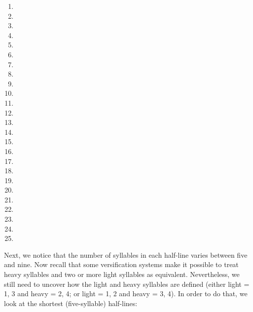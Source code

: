 \begin{refsection}
\begin{mysolution}
\begin{multicols}{2}
\begin{enumerate}[noitemsep]
    \item {}
    \item {}
    \item {}
    \item {}
    \item {}
    \item {}
    \item {}
    \item {}
    \item {}
    \item {}
    \item {}
    \item {}
    \item {}
    \item {}
    \item {}
    \item {}
    \item {}
    \item {}
    \item {}
    \item {}
    \item {}
    \item {}
    \item {}
    \item {}
    \item {}
    \blankitem
\end{enumerate}
\end{multicols}

Next, we notice that the number of syllables in each half-line varies between five and nine. Now recall that some versification systems make it possible to treat heavy syllables and two or more light syllables as equivalent. Nevertheless, we still need to uncover how the light and heavy syllables are defined (either light = 1, 3 and heavy = 2, 4; or light = 1, 2 and heavy = 3, 4). In order to do that, we look at the shortest (five-syllable) half-lines:


\end{mysolution}
\end{refsection}
